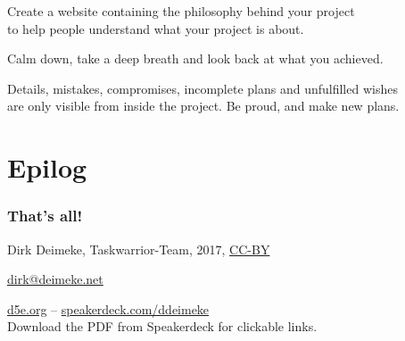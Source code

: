 \documentclass[t,handout,aspectratio=169]{beamer}
\begin{document}
\begin{frame}[fragile]%
    \vfill
    Create a website containing the philosophy behind your project \\
    to help people understand what your project is about.
\end{frame}

\begin{frame}[fragile]%
    \vfill
    Calm down, take a deep breath and look back at what you achieved. \pause

    Details, mistakes, compromises, incomplete plans and unfulfilled wishes \\
    are only visible from inside the project. Be proud, and make new plans.
\end{frame}

\section{Epilog}

\begin{frame}[fragile]\frametitle{That's all!}
    \vfill
    \begin{center}
        Dirk Deimeke, Taskwarrior-Team, 2017, \href{https://creativecommons.org/licenses/by/4.0/}{CC-BY}

        \href{mailto:dirk@deimeke.net}{dirk@deimeke.net}

        \href{https://d5e.org/}{d5e.org} -- \href{https://speakerdeck.com/ddeimeke}{speakerdeck.com/ddeimeke} \\
        {\tiny Download the PDF from Speakerdeck for clickable links.}
    \end{center}
\end{frame}
\end{document}
